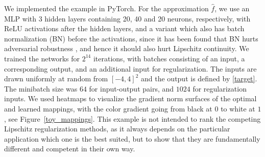 \documentclass{article}
\begin{document}
We implemented the example in PyTorch. For the approximation $\hat{f}$, we use an MLP with 3 hidden layers containing 20, 40 and 20 neurons, respectively, with ReLU activations after the hidden layers, and a variant which also has batch normalization (BN) before the activations, since it has been found that BN hurts adversarial robustness \citep{Gallowayetal2019}, and hence it should also hurt Lipschitz continuity. We trained the networks for $2^{14}$ iterations, with batches consisting of an input, a corresponding output, and an additional input for regularization. The inputs are drawn uniformly at random from $[-4, 4]^2$ and the output is defined by \eqref{target}. The minibatch size was $64$ for input-output pairs, and $1024$ for regularization inputs. We used heatmaps to visualize the gradient norm surfaces of the optimal and learned mappings, with the color gradient going from black at $0$ to white at $1$, see Figure~\ref{toy_mappings}. This example is not intended to rank the competing Lipschitz regularization methods, as it always depends on the particular application which one is the best suited, but to show that they are fundamentally different and competent in their own way.
\end{document}
